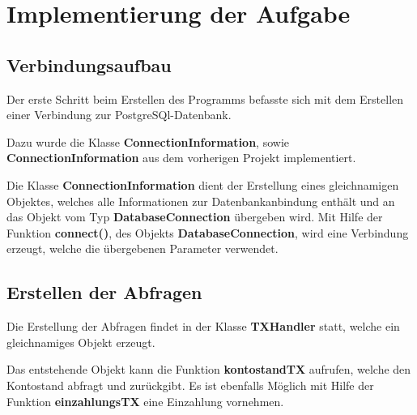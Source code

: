 \section{Implementierung der Aufgabe}

\subsection{Verbindungsaufbau}
Der erste Schritt beim Erstellen des Programms befasste sich mit dem Erstellen
einer Verbindung zur PostgreSQl-Datenbank. 

Dazu wurde die Klasse \textbf{ConnectionInformation}, sowie
\textbf{ConnectionInformation} aus dem vorherigen Projekt implementiert. 

Die Klasse \textbf{ConnectionInformation} dient der Erstellung eines gleichnamigen
Objektes, welches alle Informationen zur Datenbankanbindung enthält und an das
Objekt vom Typ \textbf{DatabaseConnection} übergeben wird. Mit Hilfe der Funktion
\textbf{connect()}, des Objekts \textbf{DatabaseConnection}, wird eine Verbindung
erzeugt, welche die übergebenen Parameter verwendet.

\subsection{Erstellen der Abfragen}
Die Erstellung der Abfragen findet in der Klasse \textbf{TXHandler} statt, welche
ein gleichnamiges Objekt erzeugt. 

Das entstehende Objekt kann die Funktion \textbf{kontostandTX} aufrufen, welche
den Kontostand abfragt und zurückgibt. Es ist ebenfalls Möglich mit Hilfe der
Funktion \textbf{einzahlungsTX} eine Einzahlung vornehmen. 

